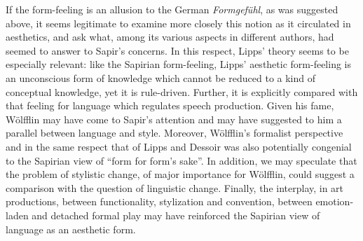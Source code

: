 \documentclass[output=paper]{langscibook}
\begin{document}
If the form-feeling is an allusion to the German \emph{Formgefühl}, as was suggested above, it seems legitimate to examine more closely this notion as it circulated in aesthetics, and ask what, among its various aspects in different authors, had seemed to answer to Sapir's concerns. In this respect, Lipps' theory seems to be especially relevant: like the Sapirian form-feeling, Lipps' aesthetic form-feeling is an unconscious form of knowledge which cannot be reduced to a kind of conceptual knowledge, yet it is rule-driven. Further, it is explicitly compared with that feeling for language which regulates speech production. Given his fame, Wölfflin may have come to Sapir's attention and may have suggested to him a parallel between language and style. Moreover, Wölfflin's formalist perspective and in the same respect that of Lipps and Dessoir was also potentially congenial to the Sapirian view of ``form for form’s sake''. In addition, we may speculate that the problem of stylistic change, of major importance for Wölfflin, could suggest a comparison with the question of linguistic change. Finally, the interplay, in art productions, between functionality, stylization and convention, between emotion-laden and detached formal play may have reinforced the Sapirian view of language as an aesthetic form.

\sloppy
\printbibliography[heading=subbibliography,notkeyword=this]
\end{document}
